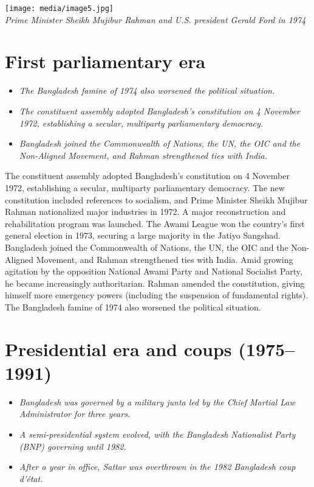 \texttt{[image: media/image5.jpg]}\\
\emph{Prime Minister Sheikh Mujibur Rahman and U.S. president Gerald
Ford in 1974}

\section{First parliamentary era}\label{first-parliamentary-era}

\begin{itemize}
\item
  \emph{The Bangladesh famine of 1974 also worsened the political
  situation.}
\item
  \emph{The constituent assembly adopted Bangladesh's constitution on 4
  November 1972, establishing a secular, multiparty parliamentary
  democracy.}
\item
  \emph{Bangladesh joined the Commonwealth of Nations, the UN, the OIC
  and the Non-Aligned Movement, and Rahman strengthened ties with
  India.}
\end{itemize}

The constituent assembly adopted Bangladesh's constitution on 4 November
1972, establishing a secular, multiparty parliamentary democracy. The
new constitution included references to socialism, and Prime Minister
Sheikh Mujibur Rahman nationalized major industries in 1972. A major
reconstruction and rehabilitation program was launched. The Awami League
won the country's first general election in 1973, securing a large
majority in the Jatiyo Sangshad. Bangladesh joined the Commonwealth of
Nations, the UN, the OIC and the Non-Aligned Movement, and Rahman
strengthened ties with India. Amid growing agitation by the opposition
National Awami Party and National Socialist Party, he became
increasingly authoritarian. Rahman amended the constitution, giving
himself more emergency powers (including the suspension of fundamental
rights). The Bangladesh famine of 1974 also worsened the political
situation.

\section{Presidential era and coups
(1975--1991)}\label{presidential-era-and-coups-19751991}

\begin{itemize}
\item
  \emph{Bangladesh was governed by a military junta led by the Chief
  Martial Law Administrator for three years.}
\item
  \emph{A semi-presidential system evolved, with the Bangladesh
  Nationalist Party (BNP) governing until 1982.}
\item
  \emph{After a year in office, Sattar was overthrown in the 1982
  Bangladesh coup d'état.}
\end{itemize}

